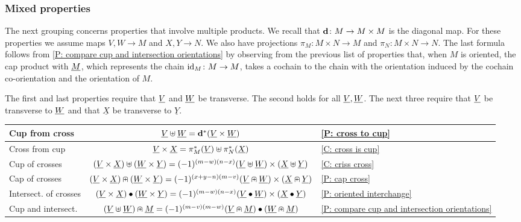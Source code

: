\subsubsection{Mixed properties}\label{S: mixed formulas}

The next grouping concerns properties that involve multiple products.
We recall that $\mathbf{d} \colon M \to M \times M$ is the diagonal map.
For these properties we assume maps $V,W \to M$ and $X,Y \to N$.
We also have projections $\pi_M \colon M \times N \to M$ and $\pi_N \colon M \times N \to N$.
The last formula follows from \cref{P: compare cup and intersection orientations} by observing from the previous list of properties that, when $M$ is oriented, the cap product with $\underline{M}$, which represents the chain $\mathrm{id}_M \colon M \to M$, takes a cochain to the chain with the orientation induced by the cochain co-orientation and the orientation of $M$.

The first and last properties require that $\underline{V}$ and $\underline{W}$ be transverse.
The second holds for all $\underline{V}, \underline{W}$.
The next three require that $\underline{V}$ be transverse to $\underline{W}$ and that $\underline{X}$ be transverse to $\underline{Y}$.

\begin{center}
	\begin{tabular}{|l|c|l|}
		\hline
		Cup from cross& $\underline{V}\uplus \underline{W} = \mathbf{d}^*(\underline{V} \times \underline{W})$&\ref{P: cross to cup}	\\
		\hline
		Cross from cup&$\underline{V} \times \underline{X} = \pi_M^*(\underline{V})\uplus\pi_N^*(\underline{X})$& \ref{C: cross is cup}	\\
		\hline
		Cup of crosses&$(\underline{V} \times \underline{X})\uplus (\underline{W} \times \underline{Y}) = (-1)^{(m-w)(n-x)} (\underline{V}\uplus \underline{W}) \times (\underline{X}\uplus \underline{Y})$ &	\ref{C: criss cross}\\
		\hline
		Cap of crosses &$(\underline{V} \times \underline{X})\nplus (\underline{W} \times \underline{Y}) = (-1)^{(x+y-n)(m-v)} (\underline{V} \nplus \underline{W}) \times (\underline{X}\nplus \underline{Y})$ & \ref{P: cap cross}\\
		\hline
		Intersect. of crosses &$(\underline{V} \times \underline{X})\bullet (\underline{W} \times \underline{Y}) = (-1)^{(m-w)(n-x)}(\underline{V}\bullet \underline{W}) \times (\underline{X}\bullet \underline{Y})$&\ref{P: oriented interchange}\\
		\hline
		Cup and intersect. &$(\underline{V}\uplus \underline{W})\nplus \underline{M} = (-1)^{(m-v)(m-w)}(\underline{V}\nplus \underline{M})\bullet(\underline{W}\nplus \underline{M})$&\ref{P: compare cup and intersection orientations}\\
		\hline
	\end{tabular}
\end{center}

